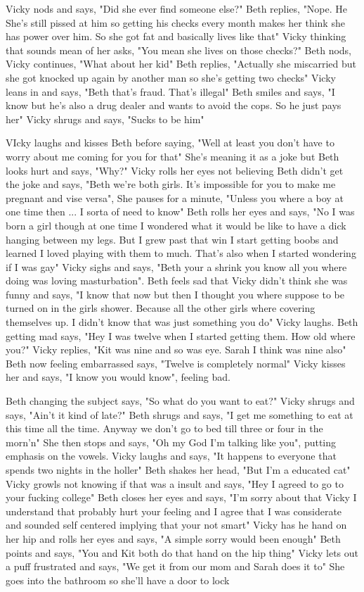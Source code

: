 \documentclass{article}[12px] %
\begin{document}
Vicky nods and says, "Did she ever find someone else?" Beth replies, "Nope. He She's still pissed at him so getting his checks every month makes her think she has power over him. So she got fat and basically lives like that" Vicky thinking that sounds mean of her asks, "You mean she lives on those checks?" Beth nods, Vicky continues, "What about her kid" Beth replies, "Actually she miscarried but she got knocked up again by another man so she's getting two checks" Vicky leans in and says, "Beth that's fraud. That's illegal" Beth smiles and says, "I know but he's also a drug dealer and wants to avoid the cops. So he just pays her" Vicky shrugs and says, "Sucks to be him"

VIcky laughs and kisses Beth before saying, "Well at least you don't have to worry about me coming for you for that" She's meaning it as a joke but Beth looks hurt and says, "Why?" Vicky rolls her eyes not believing Beth didn't get the joke and says, "Beth we're both girls. It's impossible for you to make me pregnant and vise versa", She pauses for a minute, "Unless you where a boy at one time then ... I sorta of need to know" Beth rolls her eyes and says, "No I was born a girl though at one time I wondered what it would be like to have a dick hanging between my legs. But I grew past that win I start getting boobs and learned I loved playing with them to much. That's also when I started wondering if I was gay" Vicky sighs and says, "Beth your a shrink you know all you where doing was loving masturbation". Beth feels sad that Vicky didn't think she was funny and says, "I know that now but then I thought you where suppose to be turned on in the girls shower. Because all the other girls where covering themselves up. I didn't know that was just something you do" Vicky laughs. Beth getting mad says, "Hey I was twelve when I started getting them. How old where you?" Vicky replies, "Kit was nine and so was eye. Sarah I think was nine also" Beth now feeling embarrassed says, "Twelve is completely normal" Vicky kisses her and says, "I know you would know", feeling bad.

Beth changing the subject says, "So what do you want to eat?" Vicky shrugs and says, "Ain't it kind of late?" Beth shrugs and says, "I get me something to eat at this time all the time. Anyway we don't go to bed till three or four in the morn'n" She then stops and says, "Oh my God I'm talking like you", putting emphasis on the vowels.  Vicky laughs and says, "It happens to everyone that spends two nights in the holler" Beth shakes her head, "But I'm a educated cat" Vicky growls not knowing if that was a insult and says, "Hey I agreed to go to your fucking college" Beth closes her eyes and says, "I'm sorry about that Vicky I understand that probably hurt your feeling and I agree that I was considerate and sounded self centered implying that your not smart" Vicky has he hand on her hip and rolls her eyes and says, "A simple sorry would been enough" Beth points and says, "You and Kit both do that hand on the hip thing" Vicky lets out a puff frustrated and says, "We get it from our mom and Sarah does it to" She goes into the bathroom so she'll have a door to lock
\end{document}

